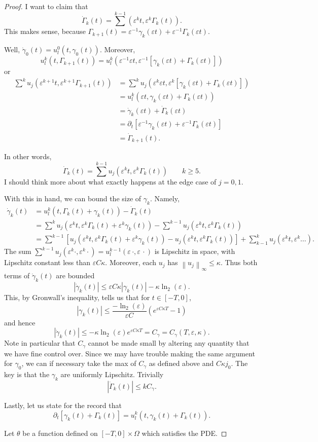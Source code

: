 \documentclass[11pt]{amsart}
\theoremstyle{remark}
\theoremstyle{definition}
\newcommand{\eps}{\varepsilon}
\newcommand{\norm}[1]{\left\lVert#1\right\rVert}
\newcommand{\paren}[1]{\left( #1 \right)}
\newcommand{\bracket}[1]{\left[ #1 \right]}
\newcommand{\del}{\partial}
\newcommand{\n}{^{-1}}
\newcommand{\ulow}{u_l}
\newcommand{\ulowth}[1]{\ulow^{#1}}
\begin{document}
\begin{proof}
I want to claim that 
\[ \dot{\Gamma}_k(t) = \sum^{k-1} (\eps^k t, \eps^k \Gamma_k(t)). \]
This makes sense, because $\Gamma_{k+1}(t) = \eps\n \gamma_k(\eps t) + \eps\n \Gamma_k(\eps t)$.  

Well, $\dot{\gamma}_0(t) = \ulowth{0}(t,\gamma_0(t))$.  Moreover, 
\[ \ulowth{k}(t,\Gamma_{k+1}(t)) = \ulowth{k}(\eps\n \eps t, \eps\n \bracket{\gamma_k(\eps t) + \Gamma_k(\eps t)}) \]
or
\begin{align*} 
\sum^k u_j(\eps^{k+1} t, \eps^{k+1} \Gamma_{k+1}(t)) &= \sum^k u_j(\eps^k \eps t, \eps^k \bracket{\gamma_k(\eps t) + \Gamma_k(\eps t)})
\\ &= \ulowth{k}(\eps t, \gamma_k(\eps t) + \Gamma_k(\eps t))
\\ &= \dot{\gamma}_k(\eps t) + \dot{\Gamma}_k(\eps t)
\\ &= \del_t \bracket{\eps\n \gamma_k(\eps t) + \eps\n \Gamma_k(\eps t)}
\\ &= \dot{\Gamma}_{k+1}(t).
\end{align*}

In other words,
\[ \dot{\Gamma}_k(t) = \sum^{k-1} u_j(\eps^k t, \eps^k \Gamma_k(t)) \qquad k \geq 5. \]
I should think more about what exactly happens at the edge case of $j=0,1$.  

With this in hand, we can bound the size of $\gamma_k$.  Namely,
\begin{align*}
\dot{\gamma}_k(t) &= \ulowth{k}(t, \Gamma_k(t) + \gamma_k(t)) - \dot{\Gamma}_k(t)
\\ &= \sum^k u_j(\eps^k t, \eps^k \Gamma_k(t) + \eps^k \gamma_k(t)) - \sum^{k-1} u_j(\eps^k t, \eps^k \Gamma_k(t))
\\ &= \sum^{k-1} \bracket{u_j(\eps^k t, \eps^k \Gamma_k(t)+\eps^k \gamma_k(t)) - u_j(\eps^k t, \eps^k \Gamma_k(t))} + \sum_{k-1}^k u_j(\eps^k t, \eps^k \ldots).
\end{align*}
The sum $\sum^{k-1} u_j(\eps^k \cdot, \eps^k \cdot) = \ulowth{k-1}(\eps \, \cdot, \eps \, \cdot)$ is Lipschitz in space, with Lipschitz constant less than $\eps C \kappa$.  Moreover, each $u_j$ has $\norm{u_j}_\infty \leq \kappa$.  Thus both terms of $\dot{\gamma}_k(t)$ are bounded
\[ |\dot{\gamma}_k(t)| \leq \eps C \kappa |\gamma_k(t)| - \kappa \ln_2(\eps). \]
This, by Gronwall's inequality, tells us that for $t \in [-T,0]$,
\[ |\gamma_k(t)| \leq \frac{-\ln_2(\eps)}{\eps C} \paren{ e^{ \eps C \kappa T} - 1} \]
and hence
\[ |\dot{\gamma}_k(t)| \leq -\kappa \ln_2(\eps) e^{\eps C \kappa T} = C_\gamma = C_\gamma(T,\eps,\kappa). \]
Note in particular that $C_\gamma$ cannot be made small by altering any quantity that we have fine control over.  Since we may have trouble making the same argument for $\gamma_0$, we can if necessary take the max of $C_\gamma$ as defined above and $C \kappa j_0$.  The key is that the $\gamma_k$ are uniformly Lipschitz.  Trivially
\[ |\dot{\Gamma}_k(t)| \leq k C_\gamma. \]

Lastly, let us state for the record that
\[ \del_t \bracket{\gamma_k(t) + \Gamma_k(t)} = \ulowth{k}(t,\gamma_k(t)+\Gamma_k(t)). \]

Let $\theta$ be a function defined on $[-T,0] \times \Omega$ which satisfies the PDE.  

\end{proof}

\end{document}
